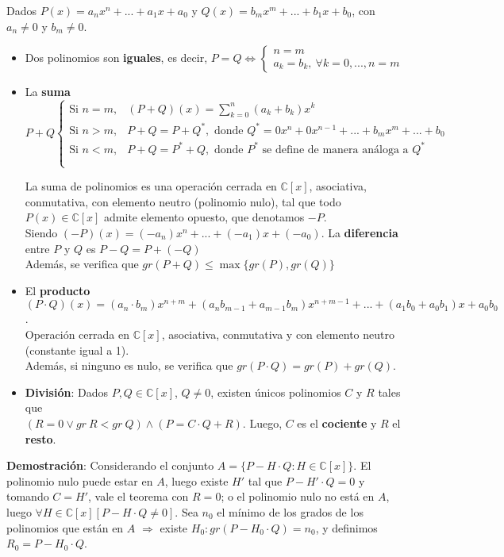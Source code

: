 \documentclass[11pt,a4paper]{article}
\begin{document}
\noindent Dados $P(x)=a_nx^n + ... + a_1x+a_0$ y $Q(x)=b_mx^m+...+b_1x+b_0$, con $a_n \not = 0$ y $b_m \not = 0$.
\begin{itemize}
\item Dos polinomios son \textbf{iguales}, es decir, $P=Q \iff \left\{\begin{array}{l} n = m\\ a_k=b_k,\ \forall k = 0,...,n=m \end{array}\right.$\\
\item La \textbf{suma} $P+Q \left\{\begin{array}{ll} 
\text{Si } n=m, & (P+Q)(x) = \sum_{k=0}^n(a_k+b_k)x^k \\
\text{Si } n>m, & P+Q = P+Q^*, \text{ donde $Q^* = 0x^n + 0x^{n-1} + ... + b_mx^m + ... + b_0$}\\
\text{Si } n<m, & P+Q = P^*+Q, \text{ donde $P^*$ se define de manera an\'aloga a $Q^*$}\\ \\
\end{array}\right.$

La suma de polinomios es una operaci\'on cerrada en $\mathbb{C}[x]$, asociativa, conmutativa, con elemento neutro (polinomio nulo), tal que todo $P(x) \in \mathbb{C}[x]$ admite elemento opuesto, que denotamos $-P$.\\ Siendo $(-P)(x) = (-a_n)x^n + ... + (-a_1)x+(-a_0)$. La \textbf{diferencia} entre $P$ y $Q$ es $P-Q = P+(-Q)$\\
Adem\'as, se verifica que $gr(P+Q) \leq \max\{gr(P), gr(Q)\}$

\item El \textbf{producto} $(P \cdot Q)(x)= (a_n\cdot b_m)x^{n+m} + (a_nb_{m-1}+a_{m-1}b_m)x^{n+m-1} + ... + (a_1b_0+a_0b_1)x + a_0b_0$.\\ Operaci\'on cerrada en $\mathbb{C}[x]$, asociativa, conmutativa y con elemento neutro (constante igual a 1).\\
Adem\'as, si ninguno es nulo, se verifica que $gr(P \cdot Q) = gr(P) + gr(Q)$.

\item \textbf{Divisi\'on}: Dados $P, Q \in \mathbb{C}[x]$, $Q\not=0$, existen \'unicos polinomios $C$ y $R$ tales que\\ 
$(R=0 \lor gr\ R < gr\ Q ) \land (P = C \cdot Q + R)$. Luego, $C$ es el \textbf{cociente} y $R$ el \textbf{resto}.
\end{itemize}
\textbf{Demostraci\'on}: Considerando el conjunto $A=\{P - H \cdot Q : H \in \mathbb{C}[x]\}$. El polinomio nulo puede estar en $A$, luego existe $H'$ tal que $P - H' \cdot Q = 0$ y tomando $C = H'$, vale el teorema con $R=0$; o el polinomio nulo no est\'a en $A$, luego $\forall H\in\mathbb{C}[x] [P - H\cdot Q\not=0]$. Sea $n_0$ el m\'inimo de los grados de los polinomios que est\'an en $A$ $\Rightarrow$ existe $H_0 : gr (P-H_0\cdot Q) = n_0$, y definimos $R_0 = P - H_0 \cdot Q$.\\
\end{document}
